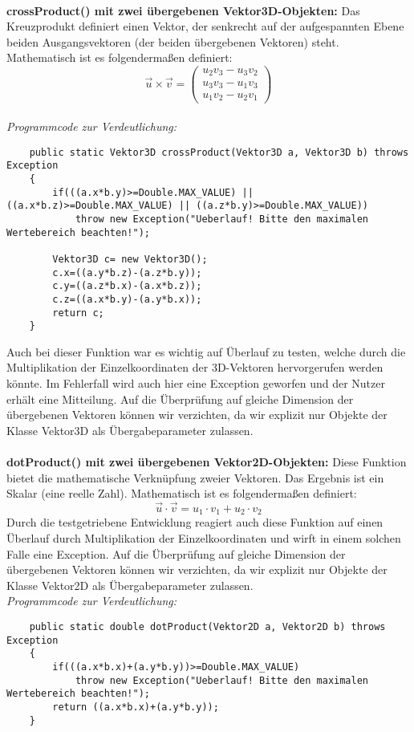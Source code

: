 \documentclass[a4paper,11pt]{scrartcl}
\begin{document}
\\
\textbf{crossProduct() mit zwei übergebenen Vektor3D-Objekten:} Das Kreuzprodukt definiert einen Vektor, der senkrecht auf der aufgespannten Ebene beiden Ausgangsvektoren (der beiden übergebenen Vektoren) steht. 
Mathematisch ist es folgendermaßen definiert:
\[ \vec u \times \vec v = \begin{pmatrix}
u_2v_3 - u_3v_2\\
u_3v_3 - u_1v_3\\
u_1v_2 - u_2v_1
\end{pmatrix}\]
\\
\textit{Programmcode zur Verdeutlichung:}
\begin{lstlisting}
	public static Vektor3D crossProduct(Vektor3D a, Vektor3D b) throws Exception
	{
		if(((a.x*b.y)>=Double.MAX_VALUE) || ((a.x*b.z)>=Double.MAX_VALUE) || ((a.z*b.y)>=Double.MAX_VALUE))
			throw new Exception("Ueberlauf! Bitte den maximalen Wertebereich beachten!");
		
		Vektor3D c= new Vektor3D();
		c.x=((a.y*b.z)-(a.z*b.y));
		c.y=((a.z*b.x)-(a.x*b.z));
		c.z=((a.x*b.y)-(a.y*b.x));
		return c;
	}
\end{lstlisting}
Auch bei dieser Funktion war es wichtig auf Überlauf zu testen, welche durch die Multiplikation der Einzelkoordinaten der 3D-Vektoren hervorgerufen werden könnte. Im Fehlerfall wird auch hier eine Exception geworfen und der Nutzer erhält eine Mitteilung. Auf die Überprüfung auf gleiche Dimension der übergebenen Vektoren können wir verzichten, da wir explizit nur Objekte der Klasse Vektor3D als Übergabeparameter zulassen.\\
\\
\textbf{dotProduct() mit zwei übergebenen Vektor2D-Objekten:} Diese Funktion bietet die mathematische Verknüpfung zweier Vektoren. Das Ergebnis ist ein Skalar (eine reelle Zahl).
Mathematisch ist es folgendermaßen definiert:
\[ \vec u \cdot \vec v = u_1 \cdot v_1 + u_2 \cdot v_2\]
Durch die testgetriebene Entwicklung reagiert auch diese Funktion auf einen Überlauf durch Multiplikation der Einzelkoordinaten und wirft in einem solchen Falle eine Exception. Auf die Überprüfung auf gleiche Dimension der übergebenen Vektoren können wir verzichten, da wir explizit nur Objekte der Klasse Vektor2D als Übergabeparameter zulassen.\\
\textit{Programmcode zur Verdeutlichung:}
\begin{lstlisting}
	public static double dotProduct(Vektor2D a, Vektor2D b) throws Exception
	{
		if(((a.x*b.x)+(a.y*b.y))>=Double.MAX_VALUE)
			throw new Exception("Ueberlauf! Bitte den maximalen Wertebereich beachten!");
		return ((a.x*b.x)+(a.y*b.y));
	}
\end{lstlisting} $\;$ \\
\end{document}
